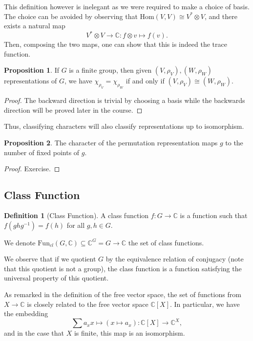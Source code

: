 \documentclass[]{article}
\theoremstyle{definition}
\theoremstyle{definition}
\newtheorem{definition}{Definition}[section]
\newtheorem{proposition}{Proposition}[section]
\begin{document}
This definition however is inelegant as we were required to make a choice of basis. 
The choice can be avoided by observing that \(\text{Hom}(V, V) \cong V^* \otimes V\), 
and there exists a natural map 
\[V^* \otimes V \to \mathbb{C} : f \otimes v \mapsto f(v).\]
Then, composing the two maps, one can show that this is indeed the trace function.

\begin{proposition}
  If \(G\) is a finite group, then given \((V, \rho_V), (W, \rho_W)\) representations 
  of \(G\), we have \(\chi_{\rho_V} = \chi_{\rho_W}\) if and only if 
  \((V, \rho_V) \cong (W, \rho_W)\).
\end{proposition}
\begin{proof}
  The backward direction is trivial by choosing a basis while the backwards direction 
  will be proved later in the course.
\end{proof}

Thus, classifying characters will also classify representations up to isomorphism.

\begin{proposition}
  The character of the permutation representation maps \(g\) to the number of 
  fixed points of \(g\).
\end{proposition}
\begin{proof}
  Exercise.
\end{proof}

\subsection{Class Function}

\begin{definition}[Class Function]
  A class function \(f : G \to \mathbb{C}\) is a function such that 
  \(f(ghg^{-1}) = f(h)\) for all \(g, h \in G\). 

  We denote \(\text{Fun}_{cl}(G, \mathbb{C}) \subseteq \mathbb{C}^G = 
    G \to \mathbb{C}\) the set of class functions.

  We observe that if we quotient \(G\) by the equivalence relation of conjugacy
  (note that this quotient is not a group), the class function is a function 
  satisfying the universal property of this quotient.
\end{definition}

As remarked in the definition of the free vector space, the set of functions 
from \(X \to \mathbb{C}\) is closely related to the free vector space 
\(\mathbb{C}[X]\). In particular, we have the embedding 
\[\sum a_x x \mapsto (x \mapsto a_x) : \mathbb{C}[X] \to \mathbb{C}^X,\]
and in the case that \(X\) is finite, this map is an isomorphism.
\end{document}
